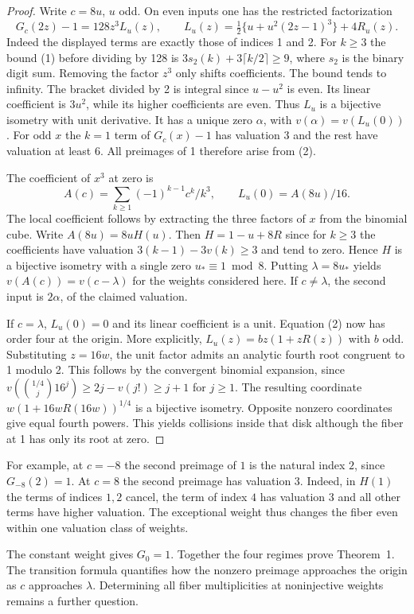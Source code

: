 \documentclass[11pt]{article}
\begin{document}
\begin{proof}
Write $c=8u$, $u$ odd. On even inputs one has the restricted factorization
\[
 G_c(2z)-1=128 z^3 L_u(z),\qquad
 L_u(z)=\tfrac12\{u+u^2(2z-1)^3\}+4R_u(z).
\tag{2}
\]
Indeed the displayed terms are exactly those of indices 1 and 2. For $k\ge3$ the bound (1) before dividing by 128 is $3s_2(k)+3\lceil k/2\rceil\ge9$, where $s_2$ is the binary digit sum. Removing the factor $z^3$ only shifts coefficients. The bound tends to infinity. The bracket divided by 2 is integral since $u-u^2$ is even. Its linear coefficient is $3u^2$, while its higher coefficients are even. Thus $L_u$ is a bijective isometry with unit derivative. It has a unique zero $\alpha$, with $v(\alpha)=v(L_u(0))$. For odd $x$ the $k=1$ term of $G_c(x)-1$ has valuation 3 and the rest have valuation at least 6. All preimages of 1 therefore arise from (2).

The coefficient of $x^3$ at zero is
\[
 A(c)=\sum_{k\ge1}(-1)^{k-1}c^k/k^3,\qquad L_u(0)=A(8u)/16 .
\]
The local coefficient follows by extracting the three factors of $x$ from the binomial cube. Write $A(8u)=8uH(u)$. Then $H=1-u+8R$ since for $k\ge3$ the coefficients have valuation $3(k-1)-3v(k)\ge3$ and tend to zero. Hence $H$ is a bijective isometry with a single zero $u_*\equiv1\bmod8$. Putting $\lambda=8u_*$ yields $v(A(c))=v(c-\lambda)$ for the weights considered here. If $c\ne\lambda$, the second input is $2\alpha$, of the claimed valuation.

If $c=\lambda$, $L_u(0)=0$ and its linear coefficient is a unit. Equation (2) now has order four at the origin. More explicitly, $L_u(z)=b z(1+zR(z))$ with $b$ odd. Substituting $z=16w$, the unit factor admits an analytic fourth root congruent to 1 modulo 2. This follows by the convergent binomial expansion, since $v(\binom{1/4}{j}16^j)\ge2j-v(j!)\ge j+1$ for $j\ge1$. The resulting coordinate $w(1+16wR(16w))^{1/4}$ is a bijective isometry. Opposite nonzero coordinates give equal fourth powers. This yields collisions inside that disk although the fiber at 1 has only its root at zero.
\end{proof}
For example, at $c=-8$ the second preimage of $1$ is the natural index $2$, since $G_{-8}(2)=1$. At $c=8$ the second preimage has valuation $3$. Indeed, in $H(1)$ the terms of indices $1,2$ cancel, the term of index $4$ has valuation $3$ and all other terms have higher valuation. The exceptional weight thus changes the fiber even within one valuation class of weights.

The constant weight gives $G_0=1$. Together the four regimes prove Theorem~1. The transition formula quantifies how the nonzero preimage approaches the origin as $c$ approaches $\lambda$. Determining all fiber multiplicities at noninjective weights remains a further question.
\end{document}
